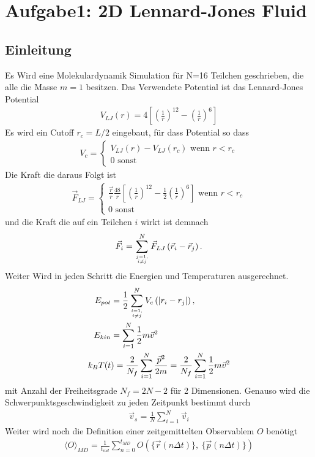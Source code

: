 
\section*{Aufgabe1: 2D Lennard-Jones Fluid}
\subsection*{Einleitung}
Es Wird eine Molekulardynamik Simulation für N=16 Teilchen geschrieben, die alle die Masse $m=1$ besitzen.
Das Verwendete Potential ist das Lennard-Jones Potential
\begin{align*}
	V_{LJ}(r)=4\left[ \left(\frac{1}{r}\right)^{12} - \left(\frac{1}{r}\right)^6\right]
\end{align*} 
Es wird ein Cutoff $r_c=L/2$ eingebaut, für dass Potential so dass 
\begin{align*}
	V_{c}=
	\begin{cases}
		V_{LJ}(r)-V_{LJ}(r_c)\text{ wenn }  r<r_c\\
		0 \text{  sonst}
	\end{cases}
\end{align*}
Die Kraft die daraus Folgt ist
\begin{align*}
	\vec{F}_{LJ}=
	\begin{cases}
		\frac{\vec{r}}{r}\frac{48}{r}\left[ \left(\frac{1}{r} \right)^{12}-\frac{1}{2}\left(\frac{1}{r}\right)^6\right] \text{ wenn } r < r_c\\
		0 \text{   sonst}
	\end{cases}
\end{align*}
und die Kraft die auf ein Teilchen $i$ wirkt ist demnach
\begin{align*}
	\vec{F}_i = \sum\limits_{j=1 , \atop i\not= j}^{N} \vec{F}_{LJ}\left( \vec{r}_i - \vec{r}_j \right).
\end{align*}
Weiter Wird in jeden Schritt die Energien und Temperaturen ausgerechnet.
\begin{align}
	E_{pot}&=\frac{1}{2}\sum\limits_{i=1 , \atop i\not= j}^{N} V_c \left(|r_i-r_j| \right),\\
	E_{kin}&=\sum\limits_{i=1}^{N}\frac{1}{2}m\vec{v}^2\\
	k_BT(t&)=\frac{2}{N_f}\sum\limits_{i=1}^{N}\frac{\vec{p}^2}{2m}= \frac{2}{N_f}\sum\limits_{i=1}^{N}\frac{1}{2}m\vec{v}^2
\end{align}
mit Anzahl der Freiheitsgrade $N_f=2N-2$ für 2 Dimensionen.
Genauso wird die Schwerpunktsgeschwindigkeit zu jeden Zeitpunkt bestimmt durch
\begin{align}
\vec{v}_s=\frac{1}{N}\sum\limits_{i=1}^{N}\vec{v}_i
\end{align}
Weiter wird noch die Definition einer zeitgemittelten Observablem $O$ benötigt
\begin{align}
\langle O \rangle_{MD} = \frac{1}{t_{md}}\sum\limits_{n=0}^{t_{MD}} O\left(\{\vec{r}(n\Delta t)\}, \ \{ \vec{p}(n\Delta t) \}\right)
\end{align}
